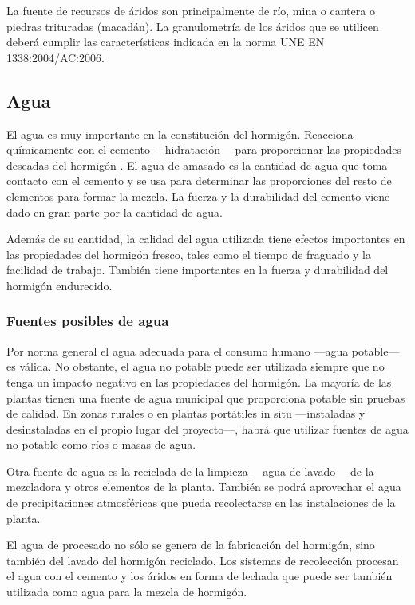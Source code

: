 La fuente de recursos de áridos son principalmente de río, mina o cantera o piedras trituradas (macadán). La granulometría de los áridos que se utilicen deberá cumplir las características indicada en la norma UNE EN 1338:2004/AC:2006.

\subsection{Agua}
El agua es muy importante en la constitución del hormigón. Reacciona químicamente con el cemento —hidratación— para proporcionar las propiedades deseadas del hormigón \cite{nrmca}. El agua de amasado es la cantidad de agua que toma contacto con el cemento y se usa para determinar las proporciones del resto de elementos para formar la mezcla. La fuerza y la durabilidad del cemento viene dado en gran parte por la cantidad de agua.

Además de su cantidad, la calidad del agua utilizada tiene efectos importantes en las propiedades del hormigón fresco, tales como el tiempo de fraguado y la facilidad de trabajo. También tiene importantes en la fuerza y durabilidad del hormigón endurecido.

\subsubsection{Fuentes posibles de agua}

Por norma general el agua adecuada para el consumo humano —agua potable— es válida. No obstante, el agua no potable puede ser utilizada siempre que no tenga un impacto negativo en las propiedades del hormigón. La mayoría de las plantas tienen una fuente de agua municipal que proporciona potable sin pruebas de calidad. En zonas rurales o en plantas portátiles in situ —instaladas y desinstaladas en el propio lugar del proyecto—, habrá que utilizar fuentes de agua no potable como ríos o masas de agua.

Otra fuente de agua es la reciclada de la limpieza —agua de lavado— de la mezcladora y otros elementos de la planta. También se podrá aprovechar el agua de precipitaciones atmosféricas que pueda recolectarse en las instalaciones de la planta.

El agua de procesado no sólo se genera de la fabricación del hormigón, sino también del lavado del hormigón reciclado. Los sistemas de recolección procesan el agua con el cemento y los áridos en forma de lechada que puede ser también utilizada como agua para la mezcla de hormigón.

